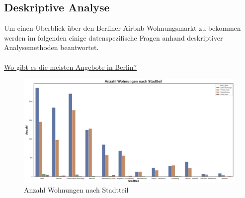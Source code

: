 \documentclass[12pt]{article}
\begin{document}
\begin{text}
\section{Deskriptive Analyse}
Um einen Überblick über den Berliner Airbnb-Wohnungsmarkt zu bekommen werden im folgenden einige datenspezifische Fragen anhand deskriptiver Analysemethoden beantwortet.
\\\\
\underline{Wo gibt es die meisten Angebote in Berlin?}

\begin{figure}[h]
 \includegraphics[width=1.1\textwidth]{AnzahlBild.PNG}
 \caption{Anzahl Wohnungen nach Stadtteil}
\end{figure}


\end{text}
\end{document}
